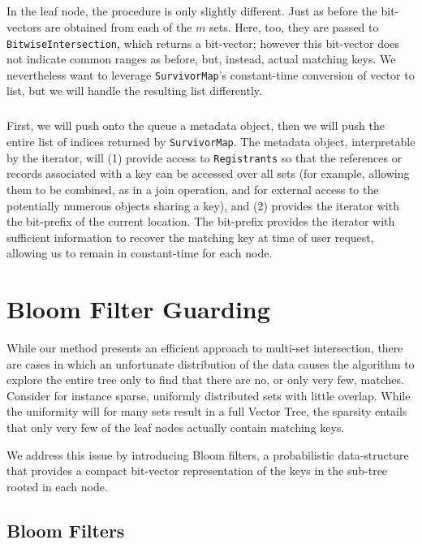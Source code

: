 \documentclass[11pt,letterpaper]{article}
\begin{document}
\subparagraph{}
In the leaf node, the procedure is only slightly different.  Just as before
the bit-vectors are obtained from each of the $m$ sets.  Here, too, they
are passed to {\tt BitwiseIntersection}, which returns a bit-vector; however
this bit-vector does not indicate common ranges as before, but, instead,
 actual matching keys.  We nevertheless want to leverage {\tt SurvivorMap}'s
constant-time conversion of vector to list, but we will handle the resulting list differently.

\subparagraph{}
First, we will push onto the queue a metadata object, then we will push the 
entire list of indices returned by {\tt SurvivorMap}.  The metadata object, 
interpretable by the iterator, will (1) provide access to {\tt Registrants} so that
the references or records associated with a key can be accessed over all sets
(for example, allowing them to be combined, as in a join operation, and for 
external access to the potentially numerous objects sharing a key), and
(2) provides the iterator with the bit-prefix of the current location.  The bit-prefix
provides the iterator with sufficient information to recover the matching key
at time of user request, allowing us to remain in constant-time for each node.


\section{Bloom Filter Guarding}

While our method presents an efficient approach to multi-set
intersection, there are cases in which an unfortunate distribution of
the data causes the algorithm to explore the entire tree only to find
that there are no, or only very few, matches. Consider for instance
sparse, uniformly distributed sets with little overlap. While the
uniformity will for many sets result in a full Vector Tree, the
sparsity entails that only very few of the leaf nodes actually contain
matching keys.

We address this issue by introducing Bloom filters, a probabilistic
data-structure that provides a compact bit-vector representation of
the keys in the sub-tree rooted in each node.

\subsection{Bloom Filters}
\end{document}
